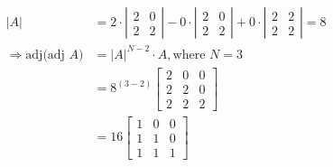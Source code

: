 \begin{solution}
  \begin{align}
    |A| &= 2\cdot\left| \begin{array}{cc}
      2 & 0 \\
      2 & 2
    \end{array}\right| - 0\cdot\left| \begin{array}{cc}
      2 & 0 \\
      2 & 2
    \end{array}\right| + 0\cdot\left| \begin{array}{cc}
      2 & 2 \\
      2 & 2
    \end{array}\right| = 8 \\
    \Rightarrow \text{adj(adj $A$)} &= |A|^{N-2}\cdot A, \text{where } N = 3 \\
            &= 8^{(3-2)}\left[
              \begin{array}{ccc}
                2 & 0 & 0 \\
                2 & 2 & 0 \\
                2 & 2 & 2
              \end{array}
            \right] \\
            &= 16\left[
              \begin{array}{ccc}
                1 & 0 & 0 \\
                1 & 1 & 0 \\
                1 & 1 & 1
              \end{array}
            \right]
  \end{align}
\end{solution}
